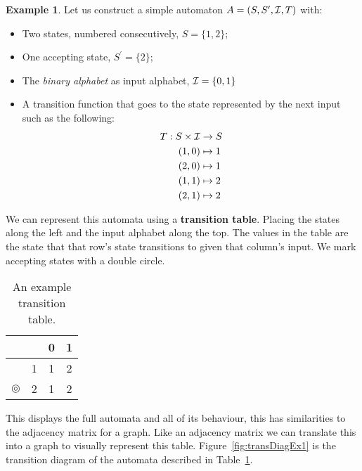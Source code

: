 \documentclass[a4paper]{article}
\theoremstyle{definition}
\theoremstyle{definition}
\newtheorem{example}{Example}[section]
\theoremstyle{definition}
\begin{document}
\newcommand{\startStateTable}{\rightarrow}
\newcommand{\acceptStateTable}{\circledcirc}
\begin{example}
    \label{exmp:egAutomata}
    Let us construct a simple automaton \(A = (S, S^\prime, \mathcal{I}, T)\) with:
    \begin{itemize}
        \item Two states, numbered consecutively, \(S = \{1, 2\}\);
        \item One accepting state, \(S^\prime = \{2\}\);
        \item The \emph{binary alphabet} as input alphabet, \(\mathcal{I} = \{0, 1\}\)
        \item A transition function that goes to the state represented by the next input such as the following:
        \begin{align*}
            T : S \times \mathcal{I} &\rightarrow S \\
            (1, 0) &\mapsto 1 \\
            (2, 0) &\mapsto 1 \\
            (1, 1) &\mapsto 2 \\
            (2, 1) &\mapsto 2
        \end{align*}
    \end{itemize}

    We can represent this automata using a \textbf{transition table}. Placing the states along the left and the input alphabet along the top. The values in the table are the state that that row's state transitions to given that column's input. We mark accepting states with a double circle.

    
    \begin{table}[H]
        \centering
        \begin{tabular}{c c | c c} 
          & & 0 & 1 \\
          \hline
           & 1 & 1 & 2 \\ 
          $\acceptStateTable$ & 2 & 1 & 2  \\ 
        \end{tabular}
        \caption{An example transition table.}
        \label{tab:stateTabEx1}
    \end{table}

    This displays the full automata and all of its behaviour, this has similarities to the adjacency matrix for a graph. Like an adjacency matrix we can translate this into a graph to visually represent this table. Figure~\ref{fig:transDiagEx1} is the transition diagram of the automata described in Table~\ref{tab:stateTabEx1}.
    

\end{example}
\end{document}
